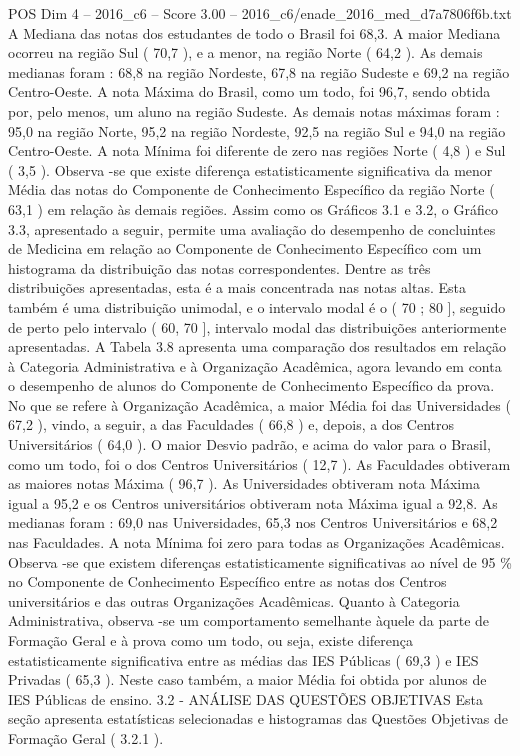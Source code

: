 \begin{textsample}{POS Dim 4 – 2016\_c6 – Score 3.00 – 2016\_c6/enade\_2016\_med\_d7a7806f6b.txt}
A Mediana das notas dos estudantes de todo o Brasil foi 68,3.
A maior Mediana ocorreu na região Sul ( 70,7 ), e a menor, na região Norte ( 64,2 ).
As demais medianas foram : 68,8 na região Nordeste, 67,8 na região Sudeste e 69,2 na região Centro-Oeste.
A nota Máxima do Brasil, como um todo, foi 96,7, sendo obtida por, pelo menos, um aluno na região Sudeste.
As demais notas máximas foram : 95,0 na região Norte, 95,2 na região Nordeste, 92,5 na região Sul e 94,0 na região Centro-Oeste.
A nota Mínima foi diferente de zero nas regiões Norte ( 4,8 ) e Sul ( 3,5 ).
Observa -se que existe diferença estatisticamente significativa da menor Média das notas do Componente de Conhecimento Específico da região Norte ( 63,1 ) em relação às demais regiões.
Assim como os Gráficos 3.1 e 3.2, o Gráfico 3.3, apresentado a seguir, permite uma avaliação do desempenho de concluintes de Medicina em relação ao Componente de Conhecimento Específico com um histograma da distribuição das notas correspondentes.
Dentre as três distribuições apresentadas, esta é a mais concentrada nas notas altas.
Esta também é uma distribuição unimodal, e o intervalo modal é o ( 70 ; 80 ], seguido de perto pelo intervalo ( 60, 70 ], intervalo modal das distribuições anteriormente apresentadas.
A Tabela 3.8 apresenta uma comparação dos resultados em relação à Categoria Administrativa e à Organização Acadêmica, agora levando em conta o desempenho de alunos do Componente de Conhecimento Específico da prova.
No que se refere à Organização Acadêmica, a maior Média foi das Universidades ( 67,2 ), vindo, a seguir, a das Faculdades ( 66,8 ) e, depois, a dos Centros Universitários ( 64,0 ).
O maior Desvio padrão, e acima do valor para o Brasil, como um todo, foi o dos Centros Universitários ( 12,7 ).
As Faculdades obtiveram as maiores notas Máxima ( 96,7 ).
As Universidades obtiveram nota Máxima igual a 95,2 e os Centros universitários obtiveram nota Máxima igual a 92,8.
As medianas foram : 69,0 nas Universidades, 65,3 nos Centros Universitários e 68,2 nas Faculdades.
A nota Mínima foi zero para todas as Organizações Acadêmicas.
Observa -se que existem diferenças estatisticamente significativas ao nível de 95 \% no Componente de Conhecimento Específico entre as notas dos Centros universitários e das outras Organizações Acadêmicas.
Quanto à Categoria Administrativa, observa -se um comportamento semelhante àquele da parte de Formação Geral e à prova como um todo, ou seja, existe diferença estatisticamente significativa entre as médias das IES Públicas ( 69,3 ) e IES Privadas ( 65,3 ).
Neste caso também, a maior Média foi obtida por alunos de IES Públicas de ensino. 3.2 - ANÁLISE DAS QUESTÕES OBJETIVAS Esta seção apresenta estatísticas selecionadas e histogramas das Questões Objetivas de Formação Geral ( 3.2.1 ).

\end{textsample}
